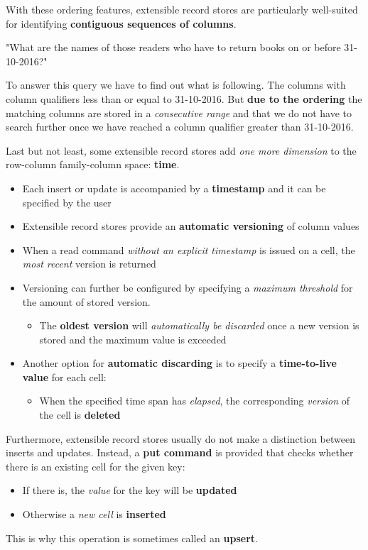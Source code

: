 \newpage
With these ordering features, extensible record stores are particularly well-suited for identifying \textbf{contiguous sequences of columns}.

\vspace{0.5cm}
\centerline{"What are the names of those readers who have to return
books on or before 31-10-2016?"}
\vspace{0.5cm}

To answer this query we have to find out what is following. The columns with column qualifiers less than or equal to 31-10-2016. But \textbf{due to the ordering} the matching columns are stored in a \textit{consecutive range} and that we do not have to search further once we have reached a column qualifier greater than 31-10-2016.

Last but not least, some extensible record stores add \textit{one more dimension} to the row-column family-column space: \textbf{time}.
\begin{itemize}
    \item Each insert or update is accompanied by a \textbf{timestamp} and it can be specified by the user
    \item Extensible record stores provide an \textbf{automatic versioning} of column values
    \item When a read command \textit{without an explicit timestamp} is issued on a cell, the \textit{most recent} version is returned
    \item Versioning can further be configured by specifying a \textit{maximum threshold} for the amount of stored version. 
    \begin{itemize}
        \item The \textbf{oldest version} will \textit{automatically be discarded} once a new version is stored and the maximum value is exceeded
    \end{itemize}
    \item Another option for \textbf{automatic discarding} is to specify a \textbf{time-to-live value} for each cell:
    \begin{itemize}
        \item When the specified time span has \textit{elapsed}, the corresponding \textit{version} of the cell is \textbf{deleted}
    \end{itemize}
\end{itemize}

Furthermore, extensible record stores usually do not make a distinction between inserts and updates. Instead, a
\textbf{put command} is provided that checks whether there is an existing cell for the given key:
\begin{itemize}
    \item If there is, the \textit{value} for the key will be \textbf{updated}
    \item Otherwise a \textit{new cell} is \textbf{inserted}
\end{itemize}
This is why this operation is sometimes called an \textbf{upsert}.

